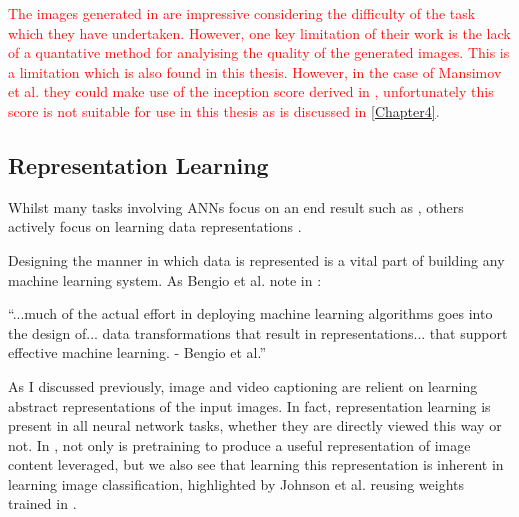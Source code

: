\textcolor{red}{The images generated in \cite{mansimov2015generating} are impressive considering the difficulty of the task which they have undertaken. However, one key limitation of their work is the lack of a quantative method for analyising the quality of the generated images. This is a limitation which is also found in this thesis. However, in the case of Mansimov et al. they could make use of the inception score derived in \cite{zhang2017stackgan}, unfortunately this score is not suitable for use in this thesis as is discussed in \autoref{Chapter4}.}

\subsection{Representation Learning}

Whilst many tasks involving \acp{ANN} focus on an end result such as \cite{krizhevsky2012imagenet}, others actively focus on learning data representations \cite{radford2015unsupervised, silberer2014learning, wavenet, vincent2010stacked, mikolov2013distributed, mikolov2013efficient, mikolov2013linguistic, feng2010visual, eslami2018neural, donahue2019large}.

Designing the manner in which data is represented is a vital part of building any machine learning system. As Bengio et al. note in \cite{repRev}:

\begin{displayquote}
``...much of the actual effort in deploying machine learning algorithms goes into the design of... data transformations that result in representations... that support effective machine learning. - Bengio et al.''
\end{displayquote}

As I discussed previously, image and video captioning are relient on learning abstract representations of the input images. In fact, representation learning is present in all neural network tasks, whether they are directly viewed this way or not. In \cite{vinyals2015show, venugopalan2014translating, johnson2016densecap}, not only is pretraining to produce a useful representation of image content leveraged, but we also see that learning this representation is inherent in learning image classification, highlighted by Johnson et al. \cite{johnson2016densecap} reusing weights trained in \cite{simonyan2014very}. 

